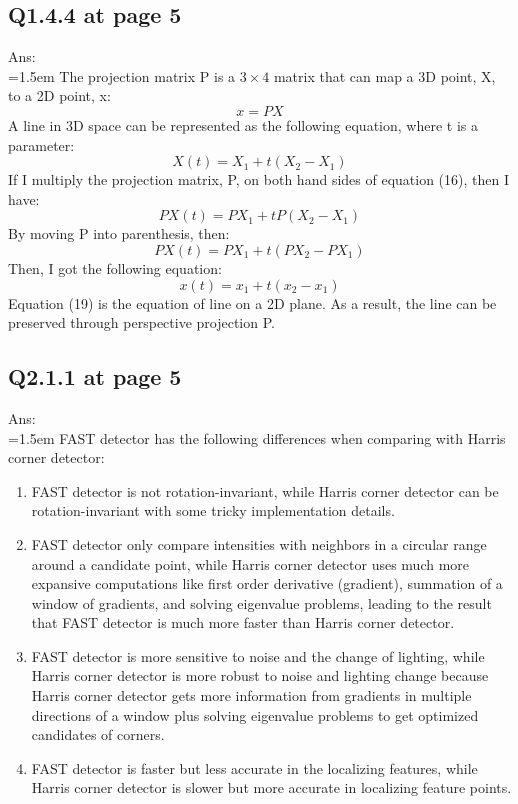 \documentclass{article}
\begin{document}
	\subsection*{Q1.4.4 at page 5}
	Ans:\\
	\hangindent=1.5em \hspace{1.5em} The projection matrix P is a $3\times4$ matrix that can map a 3D point, X, to a 2D point, x:
	\begin{equation}
		x = P X
	\end{equation}
	A line in 3D space can be represented as the following equation, where t is a parameter:
	\begin{equation}
		X(t) = X_1 + t(X_2-X_1) 
	\end{equation}
	If I multiply the projection matrix, P, on both hand sides of equation (16), then I have:
	\begin{equation}
		P X(t) = P X_1 + t P (X_2-X_1) 
	\end{equation}
	By moving P into parenthesis, then:
	\begin{equation}
		P X(t) = P X_1 + t (P X_2- P X_1) 
	\end{equation}	
	Then, I got the following equation:
	\begin{equation}
		x(t) = x_1 + t (x_2- x_1) 
	\end{equation}
	Equation (19) is the equation of line on a 2D plane. As a result, the line can be preserved through perspective projection P.	
	
	\newpage
	\subsection*{Q2.1.1 at page 5}
	Ans:\\
	\hangindent=1.5em \hspace{1.5em} FAST detector has the following differences when comparing with Harris corner detector:
	\begin{enumerate}
		\item FAST detector is not rotation-invariant, while Harris corner detector can be rotation-invariant with some tricky implementation details.		
		\item FAST detector only compare intensities with neighbors in a circular range around a candidate point, while Harris corner detector uses much more expansive computations like first order derivative (gradient), summation of a window of gradients, and solving eigenvalue problems, leading to the result that FAST detector is much more faster than Harris corner detector.
		\item FAST detector is more sensitive to noise and the change of lighting, while Harris corner detector is more robust to noise and lighting change because Harris corner detector gets more information from gradients in multiple directions of a window plus solving eigenvalue problems to get optimized candidates of corners.
		\item FAST detector is faster but less accurate in the localizing features, while Harris corner detector is slower but more accurate in localizing feature points.
	\end{enumerate}
	
\end{document}
